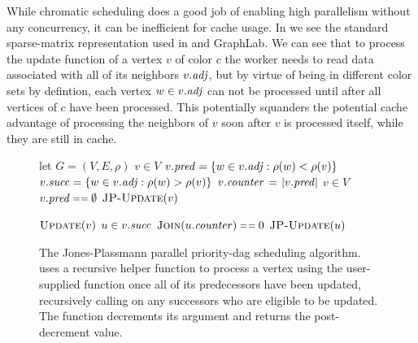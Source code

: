 While chromatic scheduling does a good job of enabling high parallelism
without any concurrency, it can be inefficient for cache usage.  In 
 we see the standard sparse-matrix representation
used in  and GraphLab.  We can see that to process
the update function of a vertex $v$ of color $c$ the worker needs to read data
associated with all of its neighbors $\attrib{v}{\id{adj}}$, but 
by virtue of being in different color sets by defintion, each
vertex $w \in \attrib{v}{\id{adj}}$ can not be processed until
after all vertices of $c$ have been processed.  This potentially
squanders the potential cache advantage of processing the neighbors
of $v$ soon after $v$ is processed itself, while they are still
in cache.


\begin{figure}[h]
  \begin{minipage}[t]{.6\linewidth}
      \begin{codebox*}
        \li let $G=(V,E,\rho)$
        \li \Parfor $v \in V$ \Do
        \li $\preds{v} = \set{w\in \attrib{v}{\id{adj}} : \rho(w) < \rho(v)}$
        \li $\succs{v} = \set{w\in \attrib{v}{\id{adj}} : \rho(w) > \rho(v)}$
        \li $\counter{v} \gets \card{\preds{v}}$
            \End {}
        \li \Parfor $v \in V$ \Do
        \li   \If $\preds{v}\isequal\emptyset$ \Then 
        \li     $\textnormal{\scshape JP-Update}(v)$
              \End
            \End  
      \end{codebox*}
    \end{minipage}
    \begin{minipage}[t]{.4\linewidth}
      \begin{codebox*}
        \li $\textnormal{\scshape Update}(v)$
        \li \Parfor $u \in\succs{v}$ \Do
        \li   \If $\proc{Join}(\counter{u}) \isequal 0$ \Then
        \li     $\textnormal{\scshape JP-Update}(u)$
              \End
            \End
      \end{codebox*}
    \end{minipage}
    \caption{The Jones-Plassmann parallel priority-dag scheduling algorithm.  
     uses
      a recursive helper function  to process a vertex
      using the user-supplied  function once all of its
      predecessors have been updated, recursively calling 
      on any successors who are eligible to be updated.  The function
       decrements its argument and returns the post-decrement
      value.}
\label{fig:jones_plassmann}
\end{figure}


